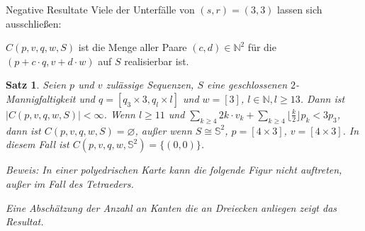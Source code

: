 \documentclass[10pt, notheorems]{beamer}
\newtheorem{theorem}{Satz}[section]
\let\emptyset\varnothing
\newcommand{\set}[1]{\{ #1 \}}
\newcommand{\nats}{\mathbb{N}}
\newcommand{\sphere}{\mathbb{S}}
\newcommand{\hdef}[1]{\textcolor{darkred2}{#1}}
\begin{document}
\begin{frame}{Negative Resultate}
  Viele der Unterfälle von $(s, r) = (3, 3)$ lassen sich ausschließen:
  \begin{definition}
    \hdef{$C(p, v, q, w, S)$} ist die Menge aller Paare $(c, d) \in \nats^2$ für die $(p + c \cdot q, v + d \cdot w)$ auf $S$ realisierbar ist.
  \end{definition}
  \pause
  \begin{theorem}
    Seien  $p$ und $v$ zulässige Sequenzen, $S$ eine geschlossenen $2$-Mannigfaltigkeit und $q = [q_3 \times 3, q_l \times l]$ und $w = [3]$, $l \in \nats, l \geq 13$. Dann ist $|C(p, v, q, w, S)| < \infty$. Wenn $l \geq 11$ und $\sum_{k \geq 4} 2k \cdot v_k + \sum_{k \geq 4} \lfloor \tfrac{k}{2} \rfloor p_k < 3p_3$, dann ist $C(p, v, q, w, S) = \emptyset$, außer wenn $S \cong \sphere^2$, $p = [4 \times 3]$, $v = [4 \times 3]$. In diesem Fall ist $C(p, v, q, w, \sphere^2) = \set{(0, 0)}$.

  \pause
    Beweis: In einer polyedrischen Karte kann die folgende Figur nicht auftreten, außer im Fall des Tetraeders.

    { \centering
      \par
    }
    Eine Abschätzung der Anzahl an Kanten die an Dreiecken anliegen zeigt das Resultat.
  \end{theorem}
\end{frame}
\end{document}
